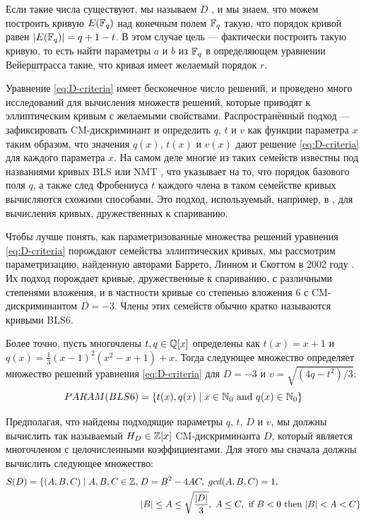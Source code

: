 Если такие числа существуют, мы называем $D$ , и мы знаем, что можем построить кривую $E(\mathbb{F}_q)$ над конечным полем $\mathbb{F}_q$ такую, что порядок кривой равен $|E(\mathbb{F}_q)|= q+1-t$. В этом случае цель  — фактически построить такую кривую, то есть найти параметры $a$ и $b$ из $\mathbb{F}_q$ в определяющем уравнении Вейерштрасса такие, что кривая имеет желаемый порядок $r$. 

Уравнение \ref{eq:D-criteria} имеет бесконечное число решений, и проведено много исследований для вычисления множеств решений, которые приводят к эллиптическим кривым с желаемыми свойствами. Распространённый подход — зафиксировать CM-дискриминант и определить $q$, $t$ и $v$ как функции параметра $x$ таким образом, что значения $q(x)$, $t(x)$ и $v(x)$ дают решение \ref{eq:D-criteria} для каждого параметра $x$. На самом деле многие из таких семейств известны под названиями кривых BLS \cite{bls-02} или NMT \cite{mnt-84}, что указывает на то, что порядок базового поля $q$, а также след Фробениуса $t$ каждого члена в таком семействе кривых вычисляются схожими способами. Это подход, используемый, например, в \cite{freeman-06}, для вычисления кривых, дружественных к спариванию.
\begin{example}
\label{ex:bls6-params} Чтобы лучше понять, как параметризованные множества решений уравнения \ref{eq:D-criteria} порождают семейства эллиптических кривых, мы рассмотрим параметризацию, найденную авторами Баррето, Линном и Скоттом в 2002 году \cite{bls-02}. Их подход порождает кривые, дружественные к спариванию, с различными степенями вложения, и в частности кривые со степенью вложения $6$ с CM-дискриминантом $D=-3$. Члены этих семейств обычно кратко называются кривыми BLS6. 

Более точно, пусть многочлены $t,q\in \mathbb{Q}[x]$ определены как $t(x)=x+1$ и $q(x) = \frac{1}{3}(x-1)^2(x^2-x+1) + x$. Тогда следующее множество определяет множество решений уравнения \ref{eq:D-criteria} для $D=-3$ и $v= \sqrt{(4 q - t^2)/3}$: 
\begin{equation}
PARAM(BLS6) = \{t(x), q(x) \;|\; x\in \mathbb{N}_0 \text{ and } q(x)\in\mathbb{N}_0\}
\end{equation}  
\end{example}

Предполагая, что найдены подходящие параметры $q$, $t$, $D$ и $v$, мы должны вычислить так называемый  $H_D\in \mathbb{Z}[x]$ CM-дискриминанта $D$, который является многочленом с целочисленными коэффициентами. Для этого мы сначала должны вычислить следующее множество:
\begin{equation}
\begin{aligned}
\label{def:hilbert_class_domain}
S(D)=\{(A,B,C)\;|\; A,B,C\in\mathbb{Z},\; &D = B^2-4AC,\; gcd(A,B,C)=1, \\
&|B|\leq A \leq \sqrt{\frac{|D|}{3}},\; A\leq C, 
\text{ if } B< 0 \text{ then } |B| < A < C\}
\end{aligned}
\end{equation}

